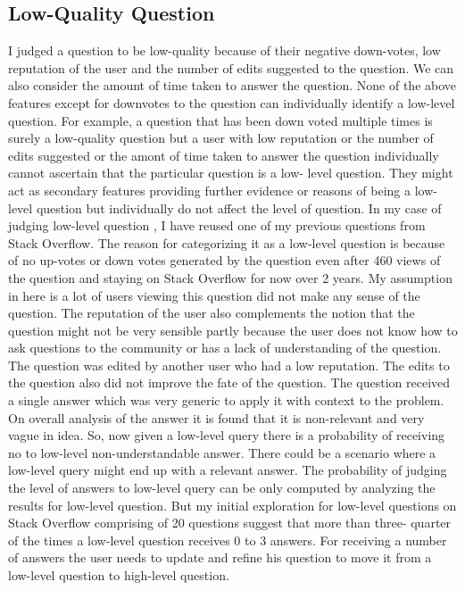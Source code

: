 \documentclass[12pt]{report}
\begin{document}
\subsection{Low-Quality Question}
I judged a question to be low-quality because of their negative down-votes, low reputation of the user and the number of edits suggested to the question. We can also consider the amount of time taken to answer the question. None of the above features except for downvotes to the question can individually identify a low-level question. For example, a question that has been down voted multiple times is surely a low-quality question but a user with low reputation or the number of edits suggested or the amont of time taken to answer the question individually cannot ascertain that the particular question is a low- level question. They might act as secondary features providing further evidence or reasons of being a low-level question but individually do not affect the level of question.
In my case of judging low-level question , I have reused one of my previous questions from Stack Overflow. The reason for categorizing it as a low-level question is because of no up-votes or down votes generated by the question even after 460 views of the question and staying on Stack Overflow for now over 2 years. My assumption in here is a lot of users viewing this question did not make any sense of the question. The reputation of the user also complements the notion that the question might not be very sensible partly because the user does not know how to ask questions to the community or has a lack of understanding of the question. 
The question was edited by another user who had a low reputation. The edits to the question also did not improve the fate of the question. The question received a single answer which was very generic to apply it with context to the problem. On overall analysis of the answer it is found that it is non-relevant and very vague in idea. So, now given a low-level query there is a probability of receiving no to low-level non-understandable answer.   
There could be a scenario where a low-level query might end up with a relevant answer. The probability of judging the level of answers to low-level query can be only computed by analyzing the results for low-level question. But my initial exploration for low-level questions on Stack Overflow comprising of 20 questions suggest that more than three- quarter of the times a low-level question receives 0 to 3 answers. For receiving a number of answers the user needs to update and refine his question to move it from a low-level question to high-level question. 
\end{document}
